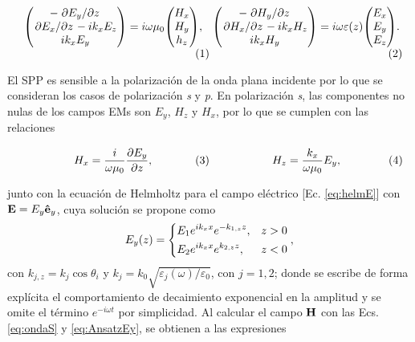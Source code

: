 	\begin{subequations}
	\eqhalf{	\mqty(-\pdv*{E_y}{z} \\ \pdv*{E_x}{z}-ik_x E_z\\ik_x E_y)
				= i\omega\mu_0 \mqty(H_x\\H_y\\h_z),}
	\eqhalf{	\mqty(-\pdv*{H_y}{z} \\ \pdv*{H_x}{z}-ik_x H_z\\ik_x H_y)
				= i\omega\varepsilon(z) \mqty(E_x\\E_y\\E_z).}	
	\end{subequations}\noindent 

El SPP es sensible a la polarización de la onda plana incidente por lo que se consideran los casos de polarización \emph{s} y \emph{p}. En polarización \emph{s}, las componentes no nulas de los campos EMs son $E_y$, $H_z$ y $H_x$, por lo que se  cumplen con las relaciones

	\begin{subequations}
	\eqhalf{	H_x =  \frac{i}{\omega \mu_0} \pdv{E_y}{z},\label{eq:Hx}}
	\eqhalf{H_z =  \frac{k_x}{\omega \mu_0} E_y, \label{eq:Hz}}	
	\label{eq:ondaS}	\end{subequations} \vspace*{-1em}

\noindent junto con la ecuación de Helmholtz para el campo eléctrico [Ec. \eqref{eq:helmE}] con  $\vb{E} = E_y\vu{e}_y$, cuya solución se propone como
	\begin{align}
	E_y(z) = \begin{dcases}
		E_1 e^{ik_x x} e^{-k_{1,z}z}, & z>0\\
		E_2 e^{ik_x x} e^{k_{2,z} z}, & z<0
		\end{dcases},\label{eq:AnsatzEy}
	\end{align}
con $k_{j,z} = k_j\cos\theta_i$ y $k_j = k_0 \sqrt{\varepsilon_j(\omega)/\varepsilon_0}$, con $j = 1,2$; donde se escribe de forma explícita el comportamiento de decaimiento exponencial en la amplitud y se omite el término $e^{-i\omega t}$ por simplicidad. Al calcular el campo $\vb{H}$ con las Ecs. \eqref{eq:ondaS} y \eqref{eq:AnsatzEy}, se obtienen a las expresiones 
	
	
